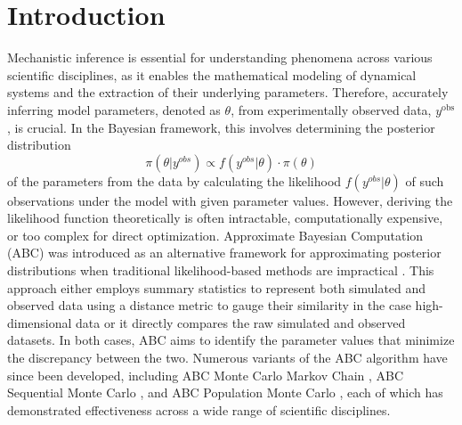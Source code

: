 \documentclass[12pt]{article} %
\begin{document}
\section{Introduction}



Mechanistic inference is essential for understanding phenomena across various scientific disciplines, as it enables the mathematical modeling of dynamical systems and the extraction of their underlying parameters. Therefore, accurately inferring model parameters, denoted as $\theta$, from experimentally observed data, $y^{\text{obs}}$, is crucial. In the Bayesian framework, this involves determining the posterior distribution
$$\pi(\theta | y^{obs}) \propto f(y^{obs} | \theta)\cdot \pi(\theta) $$
of the parameters from the data by calculating the likelihood $f(y^{obs} | \theta)$ of such observations under the model with given parameter values. However, deriving the likelihood function theoretically is often intractable, computationally expensive, or too complex for direct optimization. Approximate Bayesian Computation (ABC) was introduced as an alternative framework for approximating posterior distributions when traditional likelihood-based methods are impractical \citep{tavare1997inferring}. This approach either employs summary statistics to represent both simulated and observed data using a distance metric to gauge their similarity in the case high-dimensional data or it directly compares the raw simulated and observed datasets. In both cases, ABC aims to identify the parameter values that minimize the discrepancy between the two. Numerous variants of the ABC algorithm have since been developed, including ABC Monte Carlo Markov Chain \citep{marjoram2003markov}, ABC Sequential Monte Carlo \citep{toni2009approximate}, and ABC Population Monte Carlo \citep{robert2008adaptivity}, each of which has demonstrated effectiveness across a wide range of scientific disciplines.
\end{document}
